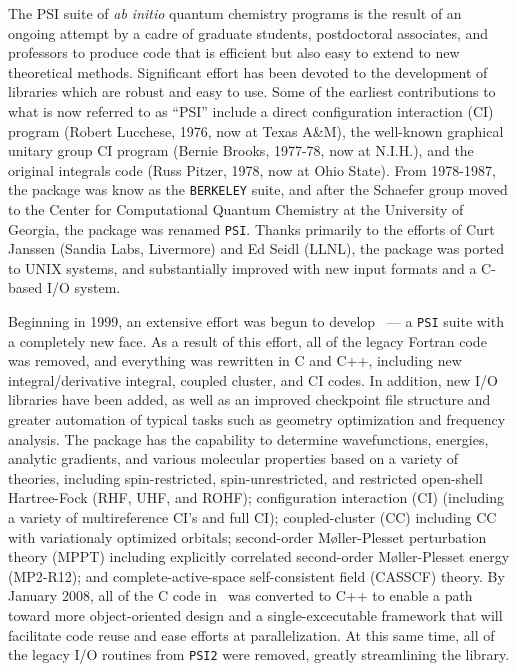%
%
%

The PSI suite of {\em ab initio} quantum chemistry programs is the result
of an ongoing attempt by a cadre of graduate students, postdoctoral
associates, and professors to produce code that is efficient but also
easy to extend to new theoretical methods.  Significant effort has been
devoted to the development of libraries which are robust and easy to use.
Some of the earliest contributions to what is now referred to as ``PSI''
include a direct configuration interaction (CI) program (Robert Lucchese,
1976, now at Texas A\&M), the well-known graphical unitary group CI program
(Bernie Brooks, 1977-78, now at N.I.H.), and the original integrals code
(Russ Pitzer, 1978, now at Ohio State).  From 1978-1987, the package was
know as the {\tt BERKELEY} suite, and after the Schaefer group moved to the
Center for Computational Quantum Chemistry at the University of Georgia,
the package was renamed {\tt PSI}.  Thanks primarily to the efforts of Curt
Janssen (Sandia Labs, Livermore) and Ed Seidl (LLNL), the package was
ported to UNIX systems, and substantially improved with new input formats
and a C-based I/O system.

Beginning in 1999, an extensive effort was begun to develop \PSIthree\
--- a {\tt PSI} suite with a completely new face.  As a result of this
effort, all of the legacy Fortran code was removed, and everything was
rewritten in C and C++, including new integral/derivative integral,
coupled cluster, and CI codes.  In addition, new I/O libraries have
been added, as well as an improved checkpoint file structure and greater
automation of typical tasks such as geometry optimization and frequency
analysis.  The package has the capability to determine wavefunctions,
energies, analytic gradients, and various molecular properties based on
a variety of theories, including spin-restricted, spin-unrestricted, and
restricted open-shell Hartree-Fock (RHF, UHF, and ROHF); configuration
interaction (CI) (including a variety of multireference CI's and full
CI); coupled-cluster (CC) including CC with variationaly optimized
orbitals; second-order M{\o}ller-Plesset perturbation theory (MPPT)
including explicitly correlated second-order M{\o}ller-Plesset energy
(MP2-R12); and complete-active-space self-consistent field (CASSCF)
theory.  By January 2008, all of the C code in \PSIthree\ was 
converted to C++ to enable a path toward more object-oriented design
and a single-excecutable framework that will facilitate code reuse and 
ease efforts at parallelization.  At this same time, all of the legacy I/O
routines from {\tt PSI2} were removed, greatly streamlining the
 library.

